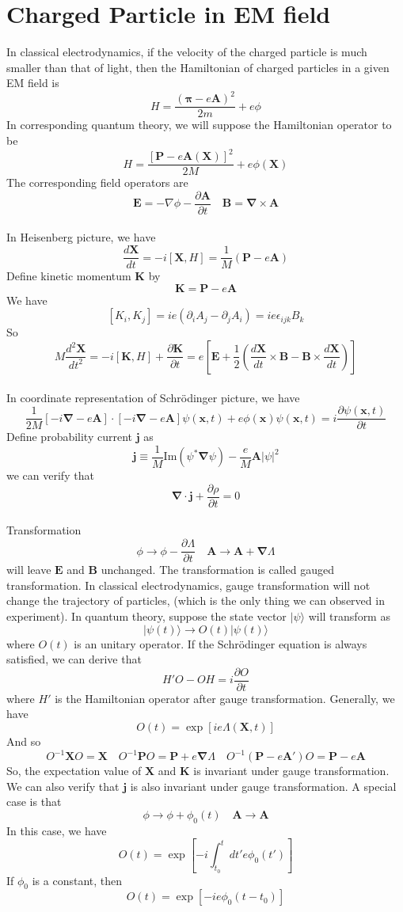\section{Charged Particle in EM field}
In classical electrodynamics, if the velocity of the charged particle is much smaller than that of light, then the Hamiltonian of charged particles in a given EM field is
\[H = \frac{(\bm{\pi}-e\bm{A})^2}{2m} + e\phi\]
In corresponding quantum theory, we will suppose the Hamiltonian operator to be
\[H = \frac{[\bm{P}-e\bm{A}(\bm{X})]^2}{2M} + e\phi(\bm{X})\]
The corresponding field operators are
\[\bm{E} = -\nabla\phi - \frac{\partial \bm{A}}{\partial t} \quad \bm{B} = \bm{\nabla}\times\bm{A}\]\\
In Heisenberg picture, we have
\[\frac{d\bm{X}}{dt} = -i[\bm{X},H] = \frac{1}{M}(\bm{P}-e\bm{A})\]
Define kinetic momentum $\bm{K}$ by
\[\bm{K} = \bm{P}-e\bm{A}\]
We have
\[[K_i,K_j] = ie(\partial_i A_j-\partial_j A_i) = ie\epsilon_{ijk}B_k\]
So
\[M \frac{d^2\bm{X}}{dt^2} = -i[\bm{K},H] + \frac{\partial \bm{K}}{\partial t} = e \left[ \bm{E}+ \frac{1}{2} \left( \frac{d\bm{X}}{dt} \times \bm{B} - \bm{B}\times\frac{d\bm{X}}{dt} \right) \right]\]\\
In coordinate representation of Schrödinger picture, we have
\[\frac{1}{2M} \left[ -i\bm{\nabla}-e\bm{A} \right] \cdot \left[ -i\bm{\nabla}-e\bm{A} \right] \psi(\bm{x},t) + e\phi(\bm{x})\psi(\bm{x},t) = i \frac{\partial \psi(\bm{x},t)}{\partial t}\]
Define probability current $\bm{j}$ as
\[\bm{j} \equiv \frac{1}{M} \mathrm{Im}(\psi^{*}\bm{\nabla}\psi) - \frac{e}{M}\bm{A}|\psi|^2\]
we can verify that
\[\bm{\nabla}\cdot\bm{j} + \frac{\partial \rho}{\partial t} = 0\]\\
Transformation
\[\phi \to \phi - \frac{\partial \Lambda}{\partial t} \quad \bm{A} \to \bm{A} + \bm{\nabla}\Lambda\]
will leave $\bm{E}$ and $\bm{B}$ unchanged. The transformation is called gauged transformation. In classical electrodynamics, gauge transformation will not change the trajectory of particles, (which is the only thing we can observed in experiment). In quantum theory, suppose the state vector $|\psi\rangle$ will transform as 
\[|\psi(t)\rangle \to O(t)|\psi(t)\rangle\]
where $O(t)$ is an unitary operator. If the Schrödinger equation is always satisfied, we can derive that
\[H'O - OH = i\frac{\partial O}{\partial t}\]
where $H'$ is the Hamiltonian operator after gauge transformation. Generally, we have
\[O(t) = \exp \left[ ie\Lambda(\bm{X},t)\right]\]
And so
\[O^{-1} \bm{X} O = \bm{X} \quad O^{-1} \bm{P} O = \bm{P} + e\bm{\nabla}\Lambda \quad O^{-1}(\bm{P}-e\bm{A}')O = \bm{P} - e\bm{A}\]
So, the expectation value of $\bm{X}$ and $\bm{K}$ is invariant under gauge transformation. We can also verify that $\bm{j}$ is also invariant under gauge transformation.
A special case is that
\[\phi \to \phi+\phi_0(t) \quad \bm{A} \to \bm{A}\]
In this case, we have
\[O(t) = \exp \left[ -i \int_{t_0}^{t} dt' e\phi_0(t') \right]\]
If $\phi_0$ is a constant, then
\[O(t) = \exp \left[ -ie\phi_0(t-t_0) \right]\]

